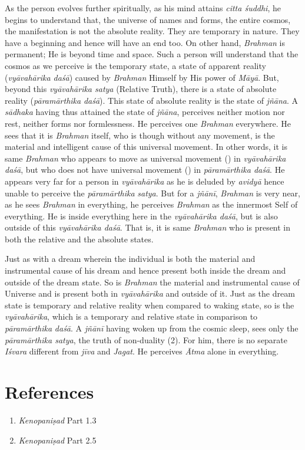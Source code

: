 As the person evolves further spiritually, as his mind attains \emph{citta śuddhi}, he begins to understand that, the universe of names and forms, the entire cosmos, the manifestation is not the absolute reality. They are temporary in nature. They have a beginning and hence will have an end too. On other hand, \emph{Brahman} is permanent; He is beyond time and space. Such a person will understand that the cosmos as we perceive is the temporary state, a state of apparent reality (\emph{vyāvahārika daśā}) caused by \emph{Brahman} Himself by His power of \emph{Māyā}. But, beyond this \emph{vyāvahārika satya} (Relative Truth), there is a state of absolute reality (\emph{pāramārthika} \emph{daśā}). This state of absolute reality is the state of \emph{jñāna}. A \emph{sādhaka} having thus attained the state of \emph{jñāna}, perceives neither motion nor rest, neither forms nor formlessness. He perceives one \emph{Brahman} everywhere. He sees that it is \emph{Brahman} itself, who is though without any movement, is the material and intelligent cause of this universal movement. In other words, it is same \emph{Brahman} who appears to move as universal movement () in \emph{vyāvahārika daśā}, but who does not have universal movement () in \emph{pāramārthika daśā}. He appears very far for a person in \emph{vyāvahārika} as he is deluded by \emph{avidyā} hence unable to perceive the \emph{pāramārthika} \emph{satya}. But for a \emph{jñānī}, \emph{Brahman} is very near, as he sees \emph{Brahman} in everything, he perceives \emph{Brahman} as the innermost Self of everything. He is inside everything here in the \emph{vyāvahārika daśā}, but is also outside of this \emph{vyāvahārika daśā}. That is, it is same \emph{Brahman} who is present in both the relative and the absolute states.

Just as with a dream wherein the individual is both the material and instrumental cause of his dream and hence present both inside the dream and outside of the dream state. So is \emph{Brahman} the material and instrumental cause of Universe and is present both in \emph{vyāvahārika} and outside of it. Just as the dream state is temporary and relative reality when compared to waking state, so is the \emph{vyāvahārika}, which is a temporary and relative state in comparison to \emph{pāramārthika} \emph{daśā}. A \emph{jñānī} having woken up from the cosmic sleep, sees only the \emph{pāramārthika satya}, the truth of non-duality (2). For him, there is no separate \emph{Iśvara} different from \emph{jīva} and \emph{Jagat}. He perceives \emph{Ātma} alone in everything.

\section*{References}

\begin{enumerate}
\itemsep=0pt
\item
  \emph{Kenopaniṣad} Part 1.3
\item
  \emph{Kenopaniṣad} Part 2.5
\end{enumerate}
